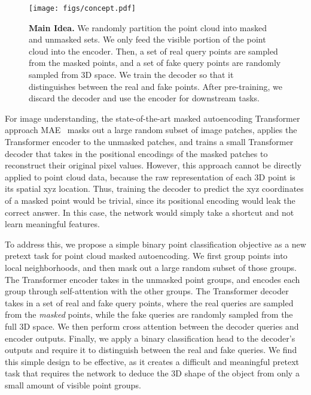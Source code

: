 \documentclass[runningheads]{llncs}
\begin{document}
\begin{figure}[t]
    \centering
    \centering
    \texttt{[image: figs/concept.pdf]}
    \caption{\textbf{Main Idea.}  We randomly partition the point cloud into masked and unmasked sets.  We only feed the visible portion of the point cloud into the encoder.  Then, a set of real query points are sampled from the masked points, and a set of fake query points are randomly sampled from 3D space.  We train the decoder so that it distinguishes between the real and fake points. After pre-training, we discard the decoder and use the encoder for downstream tasks.}
    \label{fig:main_idea}
\end{figure}

     

For image understanding, the state-of-the-art masked autoencoding Transformer approach MAE~\cite{mae} masks out a large random subset of image patches, applies the Transformer encoder to the unmasked patches, and trains a small Transformer decoder that takes in the positional encodings of the masked patches to reconstruct their original pixel values.  However, this approach cannot be directly applied to point cloud data, because the raw representation of each 3D point is its spatial xyz location. Thus, training the decoder to predict the xyz coordinates of a masked point would be trivial, since its positional encoding would leak the correct answer. In this case, the network would simply take a shortcut and not learn meaningful features.

To address this, we propose a simple binary point classification objective as a new pretext task for point cloud masked autoencoding.  We first group points into local neighborhoods, and then mask out a large random subset of those groups.  The Transformer encoder takes in the unmasked point groups, and encodes each group through self-attention with the other groups. The Transformer decoder takes in a set of real and fake query points, where the real queries are sampled from the \emph{masked} points, while the fake queries are randomly sampled from the full 3D space.  We then perform cross attention between the decoder queries and encoder outputs.  Finally, we apply a binary classification head to the decoder's outputs and require it to distinguish between the real and fake queries.  We find this simple design to be effective, as it creates a difficult and meaningful pretext task that requires the network to deduce the 3D shape of the object from only a small amount of visible point groups.
\end{document}
